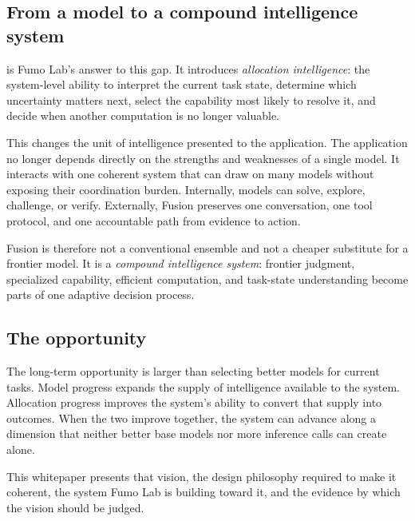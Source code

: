 \subsection{From a model to a compound intelligence system}

\systemname is Fumo Lab's answer to this gap. It introduces \emph{allocation
intelligence}: the system-level ability to interpret the current task state,
determine which uncertainty matters next, select the capability most likely to
resolve it, and decide when another computation is no longer valuable.

This changes the unit of intelligence presented to the application. The
application no longer depends directly on the strengths and weaknesses of a
single model. It interacts with one coherent system that can draw on many
models without exposing their coordination burden. Internally, models can
solve, explore, challenge, or verify. Externally, Fusion preserves one
conversation, one tool protocol, and one accountable path from evidence to
action.

Fusion is therefore not a conventional ensemble and not a cheaper substitute
for a frontier model. It is a \emph{compound intelligence system}: frontier
judgment, specialized capability, efficient computation, and task-state
understanding become parts of one adaptive decision process.

\subsection{The opportunity}

The long-term opportunity is larger than selecting better models for current
tasks. Model progress expands the supply of intelligence available to the
system. Allocation progress improves the system's ability to convert that
supply into outcomes. When the two improve together, the system can advance
along a dimension that neither better base models nor more inference calls can
create alone.

This whitepaper presents that vision, the design philosophy required to make it
coherent, the system Fumo Lab is building toward it, and the evidence by
which the vision should be judged.
